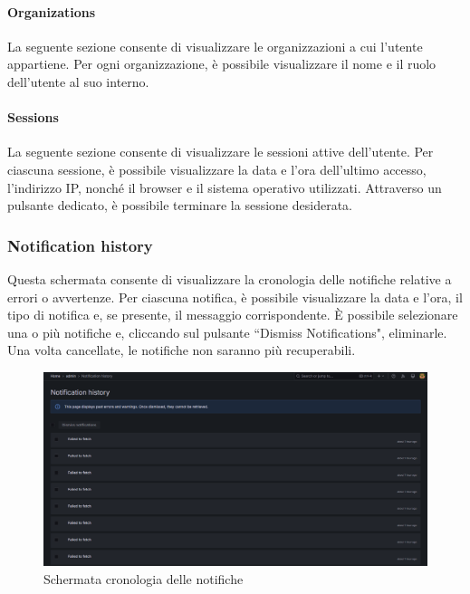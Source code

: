 \documentclass[10pt]{article}
\begin{document}
\begin{justify}
    \paragraph{Organizations}
    La seguente sezione consente di visualizzare le organizzazioni a cui l'utente appartiene. Per ogni organizzazione, è possibile visualizzare il nome e il ruolo dell'utente al suo interno.  
    
    \paragraph{Sessions}
    La seguente sezione consente di visualizzare le sessioni attive dell'utente. Per ciascuna sessione, è possibile visualizzare la data e l'ora dell'ultimo accesso, l'indirizzo IP, nonché il browser e il sistema operativo utilizzati. Attraverso un pulsante dedicato, è possibile terminare la sessione desiderata.

    \subsubsection{Notification history}
    Questa schermata consente di visualizzare la cronologia delle notifiche relative a errori o avvertenze. Per ciascuna notifica, è possibile visualizzare la data e l'ora, il tipo di notifica e, se presente, il messaggio corrispondente. È possibile selezionare una o più notifiche e, cliccando sul pulsante ``Dismiss Notifications", eliminarle. Una volta cancellate, le notifiche non saranno più recuperabili.
    \begin{figure}[H]
    \centering
    \includegraphics[width=1\linewidth]{notification.png}
    \caption{Schermata cronologia delle notifiche}
    \end{figure}


\end{justify}
\end{document}
